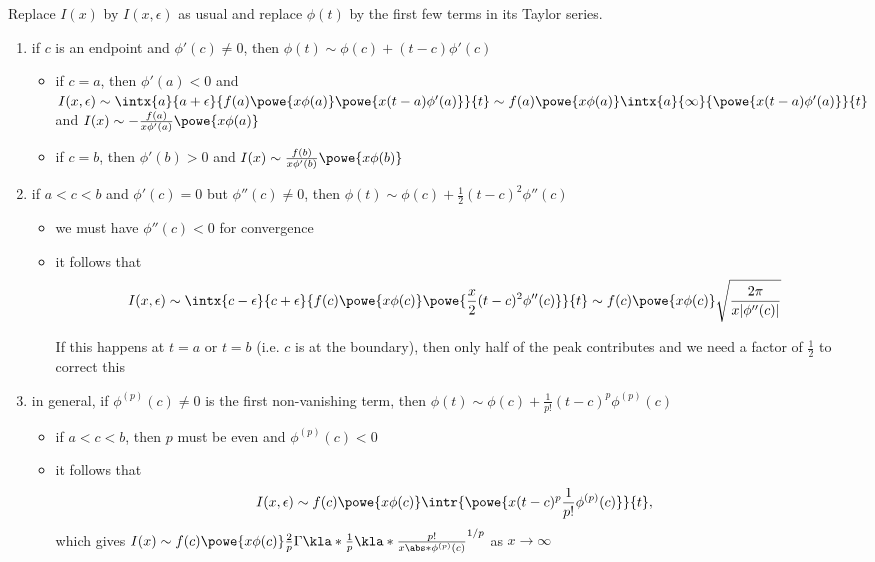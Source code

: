 \documentclass[english, parskip=full]{scrbook}
\newcommand{\definition}[2]{\begin{tcolorbox}[colback=colorbackgrounddefinition,colframe=colordefinition, breakable,enhanced,title=\textbf{#1}.]#2\end{tcolorbox}}
\newcommand{\note}[1]{\begin{tcolorbox}[colback=colorbackgroundnote,colframe=colornote, breakable,enhanced]#1\end{tcolorbox}}
\begin{document}
\definition{Direct asymptotic behavior of $I(x)$}{Replace $I(x)$ by $I(x,\epsilon)$ as usual and replace $\phi(t)$ by the first few terms in its Taylor series.
\begin{enumerate}
\item if $c$ is an endpoint and $\phi'(c)\neq 0$, then $\phi(t) \sim \phi(c) + (t-c)\phi'(c)$
\begin{itemize}
\item if $c=a$, then $\phi'(a) < 0$ and $I(x,\epsilon) \sim \intx{a}{a+\epsilon}{f(a) \powe{x\phi(a)} \powe{x(t-a) \phi'(a)}}{t} \sim f(a) \powe{x\phi(a)} \intx{a}{\infty}{\powe{x(t-a)\phi'(a)}}{t}$ and $I(x) \sim -\frac{f(a)}{x\phi'(a)} \powe{x\phi(a)}$
\item if $c=b$, then $\phi'(b)>0$ and $I(x) \sim \frac{f(b)}{x\phi'(b)} \powe{x\phi(b)}$
\end{itemize}
\item if $a<c<b$ and $\phi'(c)=0$ but $\phi''(c)\neq 0$, then $\phi(t) \sim \phi(c) + \frac{1}{2} (t-c)^2 \phi''(c)$
\begin{itemize}
\item we must have $\phi''(c) < 0$ for convergence
\item it follows that \begin{align}
I(x,\epsilon) &\sim \intx{c-\epsilon}{c+\epsilon}{f(c) \powe{x\phi(c)} \powe{\frac{x}{2}(t-c)^2 \phi''(c)}}{t} \sim f(c) \powe{x\phi(c)} \sqrt{\frac{2\pi}{x|\phi''(c)|}}
\end{align}
\note{If this happens at $t=a$ or $t=b$ (i.e. $c$ is at the boundary), then only half of the peak contributes and we need a factor of $\frac{1}{2}$ to correct this}
\end{itemize}
\item in general, if $\phi^{(p)}(c) \neq 0$ is the first non-vanishing term, then $\phi(t) \sim \phi(c) + \frac{1}{p!} (t-c)^p \phi^{(p)}(c)$
\begin{itemize}
\item if $a<c<b$, then $p$ must be even and $\phi^{(p)}(c) < 0$
\item it follows that \begin{align}
I(x,\epsilon) &\sim f(c) \powe{x\phi(c)} \intr{\powe{x (t-c)^p \frac{1}{p!} \phi^{(p)}(c)}}{t},
\end{align}
which gives $I(x) \sim f(c) \powe{x\phi(c)} \frac{2}{p} \Gamma\kla*{\frac{1}{p}} \kla*{\frac{p!}{x\abs*{\phi^{(p)}(c)}}}^{1/p}$ as $x\rightarrow\infty$
\end{itemize}
\end{enumerate}
}
\end{document}
